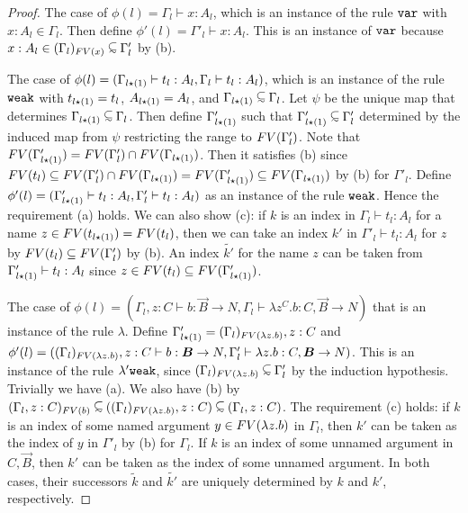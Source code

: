 \begin{proof}
  The case of $\phi(l) = \Gamma_l\vdash x:A_l$,
  which is an instance of the rule ${\tt var}$ with $x:A_l\in\Gamma_l$. 
  Then define $\phi'(l) = \Gamma'_l\vdash x:A_l$. This is an instance of ${\tt var}$
  because $x:A_l \in \Restrict{(\Gamma_l)}{\FV(x)} \subseteqsim \Gamma'_l$ by (b).

  The case of $\phi(l) = (\Gamma_{l{\star}(1)}\vdash t_l:A_l,\Gamma_{l}\vdash t_l:A_l)$,
  which is an instance of the rule ${\tt weak}$ with
  $t_{l{\star}(1)} = t_l$, $A_{l{\star}(1)} = A_{l}$, and
  $\Gamma_{l\conc(1)}\subseteqsim \Gamma_l$.
  Let $\psi$ be the unique map that determines $\Gamma_{l\conc(1)}\subseteqsim \Gamma_l$.
  Then define $\Gamma'_{l{\star}(1)}$ such that
  $\Gamma'_{l\conc(1)}\subseteqsim \Gamma'_l$ determined by
  the induced map from $\psi$ restricting the range to ${{\relax FV}}(\Gamma'_l)$.
  Note that ${{\relax FV}}(\Gamma'_{l{\star}(1)}) = {{\relax FV}}(\Gamma'_l)\cap{{\relax FV}}(\Gamma_{l{\star}(1)})$. 
  Then it satisfies (b) since ${{\relax FV}}(t_l)\subseteq {{\relax FV}}(\Gamma'_l) \cap {{\relax FV}}(\Gamma_{l{\star}(1)}) = {{\relax FV}}(\Gamma'_{l{\star}(1)}) \subseteq {{\relax FV}}(\Gamma_{l{\star}(1)})$ by (b) for $\Gamma'_l$.
  Define $\phi'(l) = (\Gamma'_{l{\star}(1)}\vdash t_l:A_l,\Gamma'_{l}\vdash t_l:A_l)$
  as an instance of the rule ${\tt weak}$. 
  Hence the requirement (a) holds.
  We can also show (c): if $k$ is an index in $\Gamma_l\vdash t_l:A_l$ for a name
  $z\in{{\relax FV}}(t_{l{\star}(1)}) = {{\relax FV}}(t_l)$, then we can take an index $k'$
  in $\Gamma'_l\vdash t_l:A_l$ for $z$ by ${{\relax FV}}(t_l)\subseteq{{\relax FV}}(\Gamma'_l)$ by (b). 
  An index $\tilde{k'}$ for the name $z$ can be taken
  from $\Gamma'_{l{\star}(1)}\vdash t_l:A_l$
  since $z \in {{\relax FV}}(t_l) \subseteq {{\relax FV}}(\Gamma'_{l{\star}(1)})$. 
  
  The case of $\phi(l) = (\Gamma_l,z:C\vdash b:\vec{B}\to N, \Gamma_l\vdash\lambda z^C.b:C,\vec{B}\to N)$
  that is an instance of the rule $\lambda$. 
  Define $\Gamma'_{l{\star}(1)} = (\Gamma_l)_{{{\relax FV}}(\lambda z.b)},z:C$ and 
  $\phi'(l) = (\Restrict{(\Gamma_l)}{\FV(\lambda z.b)},z:C\vdash b:\vec{B}\to N, \Gamma'_l\vdash \lambda z.b:C,\vec{B}\to N)$. 
  This is an instance of the rule $\lambda'{\tt weak}$, since $\Restrict{(\Gamma_l)}{\FV(\lambda z.b)}\subseteqsim \Gamma'_l$ by the induction hypothesis.
  Trivially we have (a). 
  We also have (b) by $\Restrict{(\Gamma_l,z:C)}{\FV(b)} \subseteqsim (\Restrict{(\Gamma_l)}{\FV(\lambda z.b)},z:C) \subseteqsim (\Gamma_l,z:C)$.   
  The requirement (c) holds: 
  if $k$ is an index of some named argument $y\in{{\relax FV}}(\lambda z.b)$ in $\Gamma_l$,
  then $k'$ can be taken as the index of $y$ in $\Gamma'_l$ by (b) for $\Gamma_l$.
  If $k$ is an index of some unnamed argument in $C,\vec{B}$,
  then $k'$ can be taken as the index of some unnamed argument. 
  In both cases, their successors $\tilde{k}$ and $\tilde{k'}$ are uniquely
  determined by $k$ and $k'$, respectively. 
  

\end{proof}
